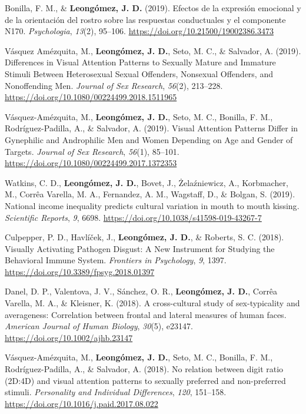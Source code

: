 \documentclass[11pt,a4paper,]{awesome-cv}
\begin{document}
\leavevmode{}%
Bonilla, F. M., \& \textbf{Leongómez, J. D.} (2019). {Efectos de la
expresi{ó}n emocional y de la orientaci{ó}n del rostro sobre las
respuestas conductuales y el componente N170}. \emph{Psychologia},
\emph{13}(2), 95--106. \url{https://doi.org/10.21500/19002386.3473}

\leavevmode{}%
Vásquez Amézquita, M., \textbf{Leongómez, J. D.}, Seto, M. C., \&
Salvador, A. (2019). {Differences in Visual Attention Patterns to
Sexually Mature and Immature Stimuli Between Heterosexual Sexual
Offenders, Nonsexual Offenders, and Nonoffending Men}. \emph{Journal of
Sex Research}, \emph{56}(2), 213--228.
\url{https://doi.org/10.1080/00224499.2018.1511965}

\leavevmode{}%
Vásquez-Amézquita, M., \textbf{Leongómez, J. D.}, Seto, M. C., Bonilla,
F. M., Rodríguez-Padilla, A., \& Salvador, A. (2019). {Visual Attention
Patterns Differ in Gynephilic and Androphilic Men and Women Depending on
Age and Gender of Targets}. \emph{Journal of Sex Research},
\emph{56}(1), 85--101.
\url{https://doi.org/10.1080/00224499.2017.1372353}

\leavevmode{}%
Watkins, C. D., \textbf{Leongómez, J. D.}, Bovet, J., Żelaźniewicz, A.,
Korbmacher, M., Corrêa Varella, M. A., Fernandez, A. M., Wagstaff, D.,
\& Bolgan, S. (2019). {National income inequality predicts cultural
variation in mouth to mouth kissing}. \emph{Scientific Reports},
\emph{9}, 6698. \url{https://doi.org/10.1038/s41598-019-43267-7}

\leavevmode{}%
Culpepper, P. D., Havlíček, J., \textbf{Leongómez, J. D.}, \& Roberts,
S. C. (2018). {Visually Activating Pathogen Disgust: A New Instrument
for Studying the Behavioral Immune System}. \emph{Frontiers in
Psychology}, \emph{9}, 1397.
\url{https://doi.org/10.3389/fpsyg.2018.01397}

\leavevmode{}%
Danel, D. P., Valentova, J. V., Sánchez, O. R.,
\textbf{Leongómez, J. D.}, Corrêa Varella, M. A., \& Kleisner, K.
(2018). {A cross-cultural study of sex-typicality and averageness:
Correlation between frontal and lateral measures of human faces}.
\emph{American Journal of Human Biology}, \emph{30}(5), e23147.
\url{https://doi.org/10.1002/ajhb.23147}

\leavevmode{}%
Vásquez-Amézquita, M., \textbf{Leongómez, J. D.}, Seto, M. C., Bonilla,
F. M., Rodríguez-Padilla, A., \& Salvador, A. (2018). {No relation
between digit ratio (2D:4D) and visual attention patterns to sexually
preferred and non-preferred stimuli}. \emph{Personality and Individual
Differences}, \emph{120}, 151--158.
\url{https://doi.org/10.1016/j.paid.2017.08.022}
\end{document}
